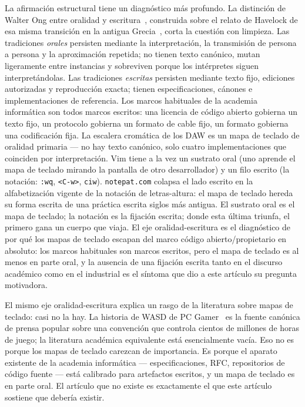 \documentclass[10pt,letterpaper,twocolumn]{article}
\begin{document}
La afirmación estructural tiene un diagnóstico más profundo. La distinción de Walter Ong entre oralidad y escritura~\citep{ong1982orality}, construida sobre el relato de Havelock de esa misma transición en la antigua Grecia~\citep{havelock1963preface}, corta la cuestión con limpieza. Las tradiciones \emph{orales} persisten mediante la interpretación, la transmisión de persona a persona y la aproximación repetida; no tienen texto canónico, mutan ligeramente entre instancias y sobreviven porque los intérpretes siguen interpretándolas. Las tradiciones \emph{escritas} persisten mediante texto fijo, ediciones autorizadas y reproducción exacta; tienen especificaciones, cánones e implementaciones de referencia. Los marcos habituales de la academia informática son todos marcos escritos: una licencia de código abierto gobierna un texto fijo, un protocolo gobierna un formato de cable fijo, un formato gobierna una codificación fija. La escalera cromática de los DAW es un mapa de teclado de oralidad primaria --- no hay texto canónico, solo cuatro implementaciones que coinciden por interpretación. Vim tiene a la vez un sustrato oral (uno aprende el mapa de teclado mirando la pantalla de otro desarrollador) y un filo escrito (la notación: \texttt{:wq}, \texttt{<C-w>}, \texttt{ciw}). \texttt{notepat.com} colapsa el lado escrito en la alfabetización vigente de la notación de letras-altura: el mapa de teclado hereda su forma escrita de una práctica escrita siglos más antigua. El sustrato oral es el mapa de teclado; la notación es la fijación escrita; donde esta última triunfa, el primero gana un cuerpo que viaja. El eje oralidad-escritura es el diagnóstico de por qué los mapas de teclado escapan del marco código abierto/propietario en absoluto: los marcos habituales son marcos escritos, pero el mapa de teclado es al menos en parte oral, y la ausencia de una fijación escrita tanto en el discurso académico como en el industrial es el síntoma que dio a este artículo su pregunta motivadora.

El mismo eje oralidad-escritura explica un rasgo de la literatura sobre mapas de teclado: casi no la hay. La historia de WASD de PC Gamer~\citep{fenlon2016wasd} es la fuente canónica de prensa popular sobre una convención que controla cientos de millones de horas de juego; la literatura académica equivalente está esencialmente vacía. Eso no es porque los mapas de teclado carezcan de importancia. Es porque el aparato existente de la academia informática --- especificaciones, RFC, repositorios de código fuente --- está calibrado para artefactos escritos, y un mapa de teclado es en parte oral. El artículo que no existe es exactamente el que este artículo sostiene que debería existir.
\end{document}
